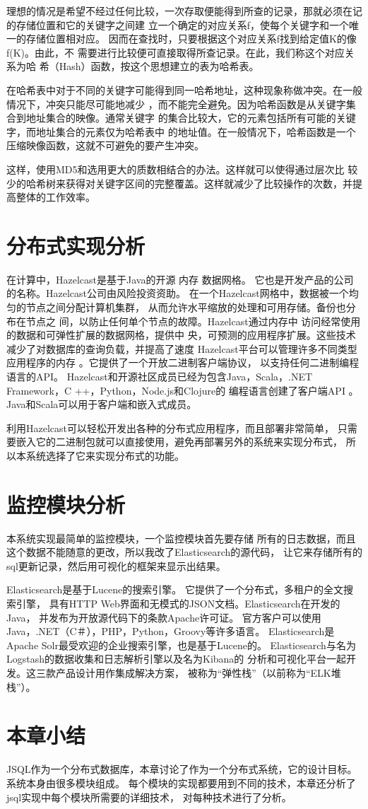 理想的情况是希望不经过任何比较，一次存取便能得到所查的记录，那就必须在记的存储位置和它的关键字之间建
立一个确定的对应关系f，使每个关键字和一个唯一的存储位置相对应。
因而在查找时，只要根据这个对应关系f找到给定值K的像f(K)。由此，不
需要进行比较便可直接取得所查记录。在此，我们称这个对应关系为哈
希（Hash）函数，按这个思想建立的表为哈希表。

在哈希表中对于不同的关键字可能得到同一哈希地址，这种现象称做冲突。在一般情况下，冲突只能尽可能地减少
，而不能完全避免。因为哈希函数是从关键字集合到地址集合的映像。通常关键字
的集合比较大，它的元素包括所有可能的关键字，而地址集合的元素仅为哈希表中
的地址值。在一般情况下，哈希函数是一个压缩映像函数，这就不可避免的要产生冲突。

这样，使用MD5和选用更大的质数相结合的办法。这样就可以使得通过层次比
较少的哈希树来获得对关键字区间的完整覆盖。这样就减少了比较操作的次数，并提高整体的工作效率。
\section{分布式实现分析}
在计算中，Hazelcast是基于Java的开源 内存 数据网格。
它也是开发产品的公司的名称。Hazelcast公司由风险投资资助。
在一个Hazelcast网格中，数据被一个均匀的节点之间分配计算机集群，
从而允许水平缩放的处理和可用存储。备份也分布在节点之
间，以防止任何单个节点的故障。Hazelcast通过内存中
访问经常使用的数据和可弹性扩展的数据网格，提供中
央，可预测的应用程序扩展。这些技术减少了对数据库的查询负载，并提高了速度
Hazelcast平台可以管理许多不同类型应用程序的内存
。它提供了一个开放二进制客户端协议，
以支持任何二进制编程语言的API。
Hazelcast和开源社区成员已经为包含Java，Scala，.NET Framework，C ++，Python，Node.js和Clojure的
编程语言创建了客户端API 。Java和Scala可以用于客户端和嵌入式成员。

利用Hazelcast可以轻松开发出各种的分布式应用程序，而且部署非常简单，
只需要嵌入它的二进制包就可以直接使用，避免再部署另外的系统来实现分布式，
所以本系统选择了它来实现分布式的功能。
\section{监控模块分析}
本系统实现最简单的监控模块，一个监控模块首先要存储
所有的日志数据，而且这个数据不能随意的更改，所以我改了Elasticsearch的源代码，
让它来存储所有的sql更新记录，然后用可视化的框架来显示出结果。

Elasticsearch是基于Lucene的搜索引擎。
它提供了一个分布式，多租户的全文搜索引擎，
具有HTTP Web界面和无模式的JSON文档。Elasticsearch在开发的Java，
并发布为开放源代码下的条款Apache许可证。
官方客户可以使用Java，.NET（C＃），PHP，Python，Groovy等许多语言。
Elasticsearch是Apache Solr最受欢迎的企业搜索引擎，也是基于Lucene的。
Elasticsearch与名为Logstash的数据收集和日志解析引擎以及名为Kibana的
分析和可视化平台一起开发。这三款产品设计用作集成解决方案，
被称为“弹性栈”（以前称为“ELK堆栈”）。
\section{本章小结}
JSQL作为一个分布式数据库，本章讨论了作为一个分布式系统，它的设计目标。
系统本身由很多模块组成。 
每个模块的实现都要用到不同的技术，本章还分析了jsql实现中每个模块所需要的详细技术，
对每种技术进行了分析。